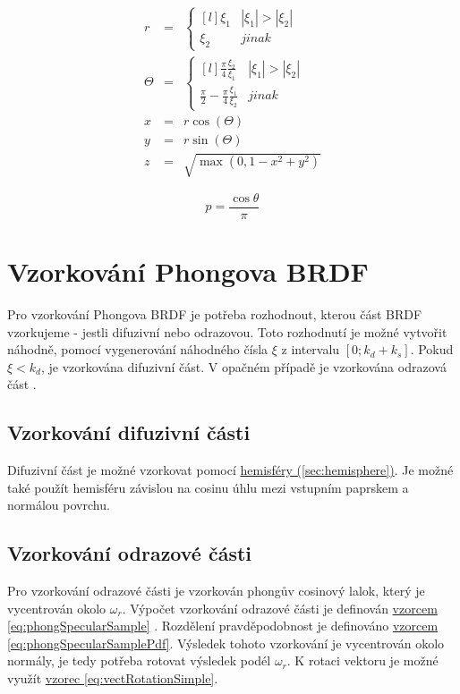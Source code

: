 \documentclass[czech,master]{diploma}
\newcommand{\interval}[1]{\left[{#1}\right]}
\newcommand{\refl}{\omega_{r}}
\newcommand{\randU}{\xi_{1}}
\newcommand{\randV}{\xi_{2}}
\begin{document}
\begin{eqnarray}
  r & = & \left\{\begin{matrix*}[l] \randU & |\randU| > \left | \randV \right |\\ \randV & jinak \end{matrix*}\right. \nonumber \\
  \Theta & = & \left\{\begin{matrix*}[l] \frac{\pi}{4}\frac{\randV}{\randU} & |\randU| > \left | \randV \right |\\ \frac{\pi}{2}-\frac{\pi}{4}\frac{\randU}{\randV} & jinak \end{matrix*}\right. \nonumber \\
  x & = &r\cos(\Theta)\nonumber \\
  y & = &r\sin(\Theta)\nonumber \\
  z & = &\sqrt{ \max(0, 1 - x^2 + y^2) }\label{eq:concentricHemisphere}
\end{eqnarray}

\begin{equation} \label{eq:concentricHemispherePdf}
  p = \frac{\cos\theta}{\pi}
\end{equation}

\section{Vzorkování Phongova BRDF} \label{sec:phongSampling}
Pro vzorkování Phongova BRDF je potřeba rozhodnout, kterou část BRDF vzorkujeme - jestli difuzivní nebo odrazovou. Toto rozhodnutí je možné vytvořit náhodně, pomocí vygenerování náhodného čísla $\xi$ z intervalu $\interval{0;k_d+k_s}$. Pokud $\xi < k_d$, je vzorkována difuzivní část. V opačném případě je vzorkována odrazová část \cite{KrivanekBRDFIBL}.
\subsection{Vzorkování difuzivní části}
Difuzivní část je možné vzorkovat pomocí \hyperref[sec:hemisphere]{hemisféry (\ref{sec:hemisphere})}. Je možné také použít hemisféru závislou na cosinu úhlu mezi vstupním paprskem a normálou povrchu.

\subsection{Vzorkování odrazové části}
Pro vzorkování odrazové části je vzorkován phongův cosinový lalok, který je vycentrován okolo $\refl$. Výpočet vzorkování odrazové části je definován \hyperref[eq:phongSpecularSample]{vzorcem \ref{eq:phongSpecularSample}} \cite{KrivanekBRDFIBL}. Rozdělení pravděpodobnost je definováno \hyperref[eq:phongSpecularSamplePdf]{vzorcem \ref{eq:phongSpecularSamplePdf}}.
Výsledek tohoto vzorkování je vycentrován okolo normály, je tedy potřeba rotovat výsledek podél $\refl$. K rotaci vektoru je možné využít \hyperref[eq:vectRotationSimple]{vzorec \ref{eq:vectRotationSimple}}.
\end{document}

